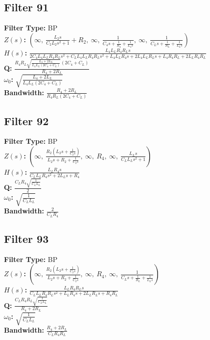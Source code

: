 \documentclass{article}
\begin{document}
\subsection*{Filter 91}
\textbf{Filter Type:} BP \\ 
\textbf{$Z(s)$:} $\left( \infty, \  \frac{L_{2} s}{C_{2} L_{2} s^{2} + 1} + R_{2}, \  \infty, \  \frac{1}{C_{4} s + \frac{1}{R_{4}} + \frac{1}{L_{4} s}}, \  \infty, \  \frac{1}{C_{L} s + \frac{1}{R_{L}} + \frac{1}{L_{L} s}}\right)$ \\ 
\textbf{$H(s)$:} $\frac{L_{4} L_{L} R_{4} R_{L} s}{2 C_{4} L_{4} L_{L} R_{4} R_{L} s^{2} + C_{L} L_{4} L_{L} R_{4} R_{L} s^{2} + L_{4} L_{L} R_{4} s + 2 L_{4} L_{L} R_{L} s + L_{4} R_{4} R_{L} + 2 L_{L} R_{4} R_{L}}$ \\ 
\textbf{Q:} $\frac{R_{4} R_{L} \sqrt{\frac{L_{4} + 2 L_{L}}{L_{4} L_{L} \left(2 C_{4} + C_{L}\right)}} \left(2 C_{4} + C_{L}\right)}{R_{4} + 2 R_{L}}$ \\ 
\textbf{$\omega_0$:} $\sqrt{\frac{L_{4} + 2 L_{L}}{L_{4} L_{L} \left(2 C_{4} + C_{L}\right)}}$ \\ 
\textbf{Bandwidth:} $\frac{R_{4} + 2 R_{L}}{R_{4} R_{L} \left(2 C_{4} + C_{L}\right)}$ \\ 
\subsection*{Filter 92}
\textbf{Filter Type:} BP \\ 
\textbf{$Z(s)$:} $\left( \infty, \  \frac{R_{2} \left(L_{2} s + \frac{1}{C_{2} s}\right)}{L_{2} s + R_{2} + \frac{1}{C_{2} s}}, \  \infty, \  R_{4}, \  \infty, \  \frac{L_{L} s}{C_{L} L_{L} s^{2} + 1}\right)$ \\ 
\textbf{$H(s)$:} $\frac{L_{L} R_{4} s}{C_{L} L_{L} R_{4} s^{2} + 2 L_{L} s + R_{4}}$ \\ 
\textbf{Q:} $\frac{C_{L} R_{4} \sqrt{\frac{1}{C_{L} L_{L}}}}{2}$ \\ 
\textbf{$\omega_0$:} $\sqrt{\frac{1}{C_{L} L_{L}}}$ \\ 
\textbf{Bandwidth:} $\frac{2}{C_{L} R_{4}}$ \\ 
\subsection*{Filter 93}
\textbf{Filter Type:} BP \\ 
\textbf{$Z(s)$:} $\left( \infty, \  \frac{R_{2} \left(L_{2} s + \frac{1}{C_{2} s}\right)}{L_{2} s + R_{2} + \frac{1}{C_{2} s}}, \  \infty, \  R_{4}, \  \infty, \  \frac{1}{C_{L} s + \frac{1}{R_{L}} + \frac{1}{L_{L} s}}\right)$ \\ 
\textbf{$H(s)$:} $\frac{L_{L} R_{4} R_{L} s}{C_{L} L_{L} R_{4} R_{L} s^{2} + L_{L} R_{4} s + 2 L_{L} R_{L} s + R_{4} R_{L}}$ \\ 
\textbf{Q:} $\frac{C_{L} R_{4} R_{L} \sqrt{\frac{1}{C_{L} L_{L}}}}{R_{4} + 2 R_{L}}$ \\ 
\textbf{$\omega_0$:} $\sqrt{\frac{1}{C_{L} L_{L}}}$ \\ 
\textbf{Bandwidth:} $\frac{R_{4} + 2 R_{L}}{C_{L} R_{4} R_{L}}$ \\ 
\end{document}
